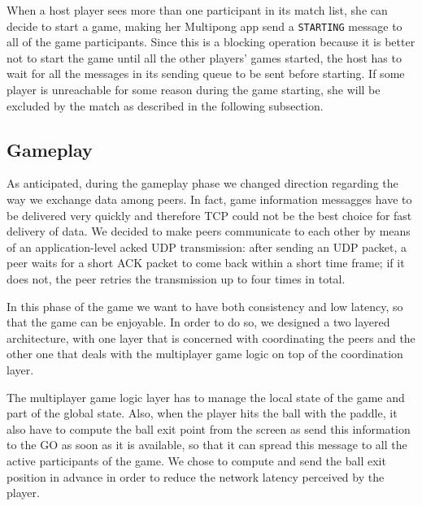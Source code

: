 When a host player sees more than one participant in its match list, she can
decide to start a game, making her Multipong app send a \texttt{STARTING}
message to all of the game participants. Since this is a blocking operation
because it is better not to start the game until all the other players' games
started, the host has to wait for all the messages in its sending queue to be
sent before starting. If some player is unreachable for some reason
during the game starting, she will be excluded by the match as described in
the following subsection.

\subsection{Gameplay}

As anticipated, during the gameplay phase we changed direction regarding the
way we exchange data among peers. In fact, game information messagges have to
be delivered very quickly and therefore TCP could not be the best choice for
fast delivery of data. We decided to make peers communicate to each other by
means of an application-level acked UDP transmission: after sending an UDP
packet, a peer waits for a short ACK packet to come back within a short time
frame; if it does not, the peer retries the transmission up to four times in
total.

In this phase of the game we want to have both consistency and low latency, so
that the game can be enjoyable. In order to do so, we designed a two layered
architecture, with one layer that is concerned with coordinating the peers and
the other one that deals with the multiplayer game logic on top of the
coordination layer.

The multiplayer game logic layer has to manage the local state of the game and
part of the global state. Also, when the player hits the ball with the paddle,
it also have to compute the ball exit point from the screen as send this
information to the GO as soon as it is available, so that it can spread this
message to all the active participants of the game. We chose to compute and
send the ball exit position in advance in order to reduce the network latency
perceived by the player.

